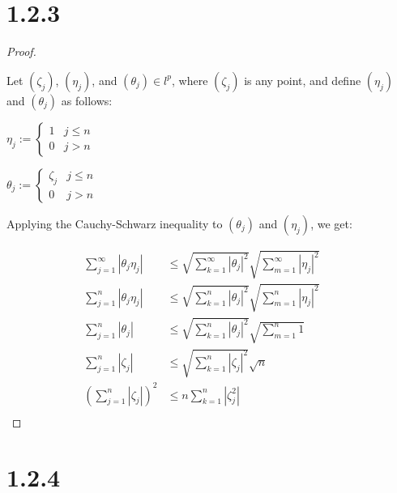 \documentclass{article}
\begin{document}
\section*{1.2.3}
\begin{proof}
  $ $
  
  Let $(\zeta_j)$, $(\eta_j)$, and $(\theta_j) \in l^p$, where $(\zeta_j)$ is any point, and define $(\eta_j)$ and $(\theta_j)$ as follows:

  $\eta_j := \begin{cases}
    1 & j \leq n \\
    0 & j > n
  \end{cases}$

  $\theta_j := \begin{cases}
    \zeta_j & j \leq n \\
    0 & j > n
  \end{cases}$
  \newline

  \noindent
  Applying the Cauchy-Schwarz inequality to $(\theta_j)$ and $(\eta_j)$, we get:

  \begin{align*}
    \sum_{j=1}^{\infty} |\theta_j \eta_j| 
    &\leq \sqrt{\sum_{k=1}^{\infty} |\theta_j|^2} \sqrt{\sum_{m=1}^{\infty} |\eta_j|^2} &&\\
    \sum_{j=1}^{n} |\theta_j \eta_j| 
    &\leq \sqrt{\sum_{k=1}^{n} |\theta_j|^2} \sqrt{\sum_{m=1}^{n} |\eta_j|^2} &&\\
    \sum_{j=1}^{n} |\theta_j| 
    &\leq \sqrt{\sum_{k=1}^{n} |\theta_j|^2} \sqrt{\sum_{m=1}^{n} 1} &&\\
    \sum_{j=1}^{n} |\zeta_j| 
    &\leq \sqrt{\sum_{k=1}^{n} |\zeta_j|^2} \sqrt{n} &&\\
    \left( \sum_{j=1}^{n} |\zeta_j| \right)^2
    &\leq n \sum_{k=1}^{n} |\zeta_j^2| &&\\
  \end{align*}
\end{proof}

\section*{1.2.4}


\end{document}
